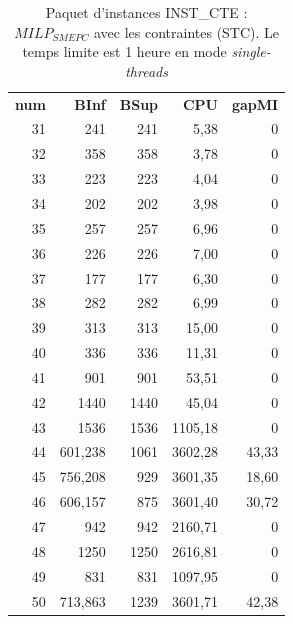 {\begin{table}[H]
	\centering
	\small
	\begin{tabular}{|r|r|r|r|r|}
		\hline
		\toprule
		\rowcolor{cyan}	\multicolumn{4}{c}{ STC}                       &  \\ \hline
		\midrule
		\rowcolor{cyan}	\textbf{num} &  \textbf{BInf} & \textbf{BSup}  & \textbf{CPU} & \textbf{gapMI} \\ \hline
		\midrule
	31	&	241	&	241	&	5,38	&	0	\\ \hline
	32	&	358	&	358	&	3,78	&	0	\\ \hline
	33	&	223	&	223	&	4,04	&	0	\\ \hline
	34	&	202	&	202	&	3,98	&	0	\\ \hline
	35	&	257	&	257	&	6,96	&	0	\\ \hline
	36	&	226	&	226	&	7,00	&	0	\\ \hline
	37	&	177	&	177	&	6,30	&	0	\\ \hline
	38	&	282	&	282	&	6,99	&	0	\\ \hline
	39	&	313	&	313	&	15,00	&	0	\\ \hline
	40	&	336	&	336	&	11,31	&	0	\\ \hline
	41	&	901	&	901	&	53,51	&	0	\\ \hline
	42	&	1440	&	1440	&	45,04	&	0	\\ \hline
	43	&	1536	&	1536	&	1105,18	&	0	\\ \hline
	44	&	601,238	&	1061	&	3602,28	&	43,33	\\ \hline
	45	&	756,208	&	929	&	3601,35	&	18,60	\\ \hline
	46	&	606,157	&	875	&	3601,40	&	30,72	\\ \hline
	47	&	942	&	942	&	2160,71	&	0	\\ \hline
	48	&	1250	&	1250	&	2616,81	&	0	\\ \hline
	49	&	831	&	831	&	1097,95	&	0	\\ \hline
	50	&	713,863	&	1239	&	3601,71	&	42,38	\\ \hline
	
		

		\bottomrule
\end{tabular}%
\caption[Résultats de $MILP_{SMEPC}$ enrichi de STC sur INST\_CTE. Le temps limite est 1 heure en mode \textit{single-threads}]{Paquet d'instances INST\_CTE : $MILP_{SMEPC}$  avec les contraintes (STC). Le temps limite est 1 heure en mode \textit{single-threads}}
\label{tab:ChSymStc1}%
\end{table}%


}
